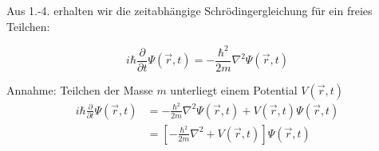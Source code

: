 Aus 1.-4. erhalten wir die zeitabhängige Schrödingergleichung für ein
freies Teilchen:

  \begin{equation}
    \label{eq:11}
    \boxed{i\hbar\frac{\partial}{\partial t}\Psi(\vec{r},t)
      =-\frac{\hbar^2}{2m}\nabla^2\Psi(\vec{r},t)}
  \end{equation}


Annahme: Teilchen der Masse $m$ unterliegt einem Potential $V(\vec{r},t)$
\begin{align*}
  i\hbar\frac{\partial}{\partial t}\Psi(\vec{r},t) 
  &=-\frac{\hbar^{2}}{2m}\nabla^2\Psi(\vec{r},t)+V(\vec{r},t)\Psi(\vec{r},t)\\
  &=\left[-\frac{\hbar^{2}}{2m}\nabla^2+V(\vec{r},t)\right]\Psi(\vec{r},t)
\end{align*}





